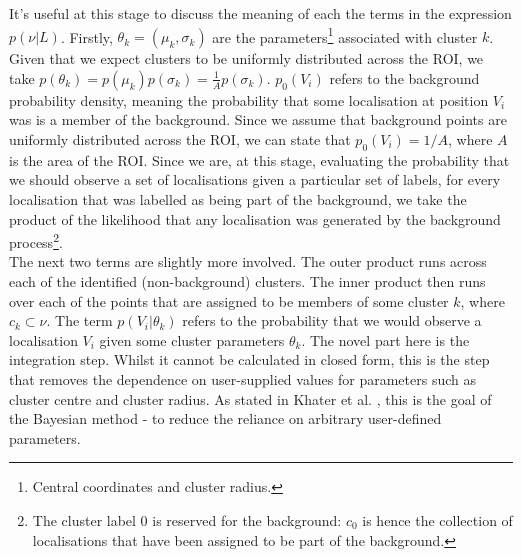 \documentclass[11pt]{article}
\begin{document}
It's useful at this stage to discuss the meaning of each the terms in the expression $ p(\nu|L)$. Firstly, $\theta_k = (\mu_k, \sigma_k)$ are the parameters\footnote{Central coordinates and cluster radius.} associated with cluster $k$. Given that we expect clusters to be uniformly distributed across the ROI, we take $p(\theta_k) = p(\mu_k)p(\sigma_k) = \frac{1}{A}p(\sigma_k)$.
$p_0(V_i)$ refers to the background probability density, meaning the probability that some localisation at position $V_i$ was is a member of the background. Since we assume that background points are uniformly distributed across the ROI, we can state that $p_0(V_i) = 1 / A$, where $A$ is the area of the ROI.
Since we are, at this stage, evaluating the probability that we should observe a set of localisations given a particular set of labels, for every localisation that was labelled as being part of the background, we take the product of the likelihood that any localisation was generated by the background process\footnote{The cluster label 0 is reserved for the background: $c_0$ is hence the collection of localisations that have been assigned to be part of the background.}.\\

The next two terms are slightly more involved. The outer product runs across each of the identified (non-background) clusters. The inner product then runs over each of the points that are assigned to be members of some cluster $k$, where $c_k \subset \nu$. The term $p(V_i | \theta_k)$ refers to the probability that we would observe a localisation $V_i$ given some cluster parameters $\theta_k$. The novel part here is the integration step. Whilst it cannot be calculated in closed form, this is the step that removes the dependence on user-supplied values for parameters such as cluster centre and cluster radius. As stated in Khater et al. \cite{Khater2020}, this is the goal of the Bayesian method - to reduce the reliance on arbitrary user-defined parameters. \\

\end{document}
